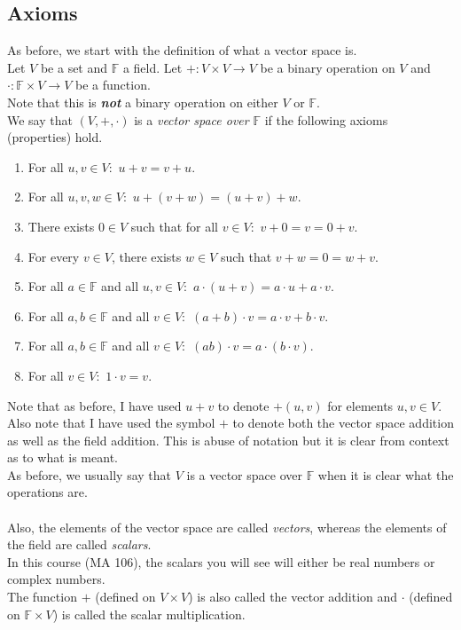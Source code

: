 \documentclass[12pt]{article}
\begin{document}
\subsection{Axioms}
As before, we start with the definition of what a vector space is.\\
Let $V$ be a set and $\mathbb{F}$ a field. Let $+:V\times V\to V$ be a binary operation on $V$ and $\cdot:\mathbb{F}\times V\to V$ be a function.\\
Note that this is \emph{\textbf{not}} a binary operation on either $V$ or $\mathbb{F}.$\\
We say that $(V, +, \cdot)$ is a \emph{vector space over} $\mathbb{F}$ if the following axioms (properties) hold.
\begin{enumerate}[label = (A\arabic*)] 
	\item For all $u, v \in V:$ $u + v = v + u.$
	\item For all $u, v, w \in V:$ $u + (v + w) = (u + v) + w.$
	\item There exists $0 \in V$ such that for all $v \in V:$ $v + 0 = v = 0 + v.$
	\item For every $v \in V$, there exists $w \in V$ such that $v + w = 0 = w + v.$
	\item For all $a \in \mathbb{F}$ and all $u, v \in V:$ $a\cdot(u + v) = a\cdot u + a\cdot v.$
	\item For all $a, b \in \mathbb{F}$ and all $v \in V:$ $(a + b)\cdot v = a\cdot v + b\cdot v.$
	\item For all $a, b \in \mathbb{F}$ and all $v \in V:$ $(ab)\cdot v = a\cdot (b\cdot v).$
	\item For all $v \in V:$ $1\cdot v = v.$
\end{enumerate}
Note that as before, I have used $u + v$ to denote $+(u, v)$ for elements $u, v \in V.$\\
Also note that I have used the symbol $+$ to denote both the vector space addition as well as the field addition. This is abuse of notation but it is clear from context as to what is meant.\\
As before, we usually say that $V$ is a vector space over $\mathbb{F}$ when it is clear what the operations are.\\~\\
Also, the elements of the vector space are called \emph{vectors}, whereas the elements of the field are called \emph{scalars}.\\
In this course (MA 106), the scalars you will see will either be real numbers or complex numbers.\\
The function $+$ (defined on $V\times V$) is also called the vector addition and $\cdot$ (defined on $\mathbb{F}\times V$) is called the scalar multiplication.
\end{document}
